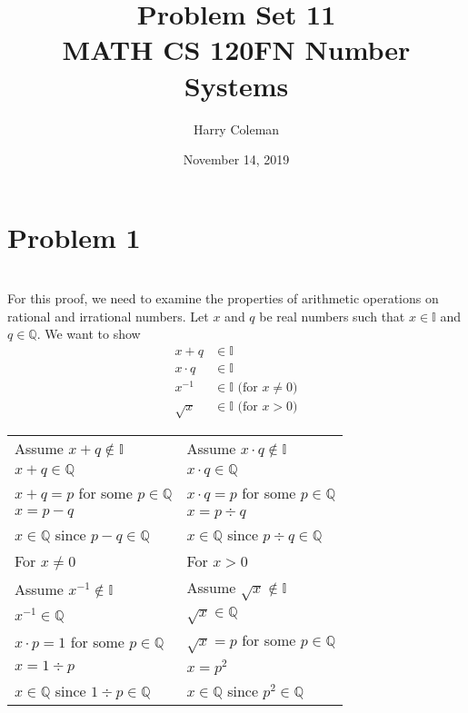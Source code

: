 \documentclass[12pt]{article}
\newcommand{\I}{\mathbb{I}}
\newcommand{\Q}{\mathbb{Q}}
\begin{document}
 
\title{Problem Set 11\\
    \large MATH CS 120FN Number Systems}
\author{Harry Coleman}
\date{November 14, 2019}

\maketitle

\section*{Problem 1}
\\

For this proof, we need to examine the properties of arithmetic operations on rational and irrational numbers. Let $x$ and $q$ be real numbers such that $x\in\I$ and $q \in\Q$. We want to show
\begin{align*}
    x + q &\in\I \\
    x \cdot q &\in\I \\
    x^{-1} &\in\I \text{ (for $x\ne0$)}\\
    \sqrt{x} &\in\I \text{ (for $x>0$)}
\end{align*}
\begin{center}
    \begin{tabular}{l|l}
        Assume $x+q \notin\I$           & Assume $x\cdot q \notin\I$ \\
        $x+q \in\Q$                     & $x \cdot q \in\Q$ \\
        $x+q = p$ for some $p\in\Q$     & $x \cdot q = p$ for some $p\in\Q$ \\
        $x = p-q$                       & $x = p \div q$ \\
        $x\in\Q$ since $p-q \in\Q$      & $x\in\Q$ since $p\div q \in\Q$ \\
        \hline
        For $x\ne0$                     & For $x>0$ \\
        Assume $x^{-1} \notin\I$        & Assume $\sqrt{x} \notin\I$ \\
        $x^{-1} \in\Q$                  & $\sqrt{x} \in\Q$ \\
        $x \cdot p=1$ for some $p\in\Q$ & $\sqrt{x} = p$ for some $p\in\Q$ \\
        $x = 1\div p$                   & $x = p^2$ \\
        $x \in\Q$ since $1\div p\in\Q$  & $x\in\Q$ since $p^2\in\Q$ \\
    \end{tabular}
\end{center}
\end{document}
